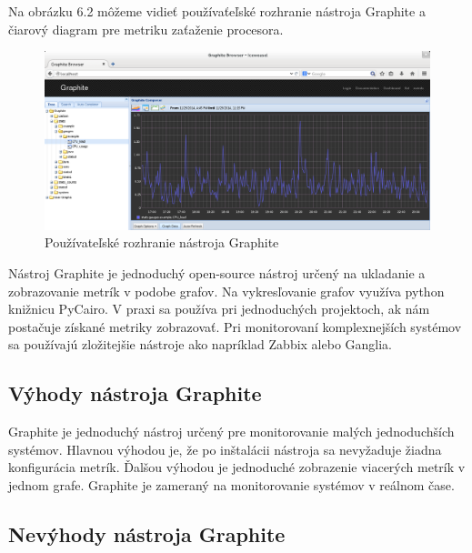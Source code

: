 \documentclass[a4paper, upjsfrontpage, disablespecwarning, thesismargins, thesislinespacing]{rnthesis}
\begin{document}
Na obrázku 6.2 môžeme vidieť používaťeľské rozhranie nástroja Graphite a čiarový diagram pre metriku zaťaženie procesora.

\begin{figure}
\begin{center}
\includegraphics[scale=0.41]{graphite1.png}
\caption{Používateľské rozhranie nástroja Graphite}
\end{center}
\end{figure}

Nástroj Graphite je jednoduchý open-source nástroj určený na ukladanie a zobrazovanie metrík v podobe grafov.
Na vykresľovanie grafov využíva python knižnicu PyCairo.
V praxi sa používa pri jednoduchých projektoch, ak nám postačuje získané metriky zobrazovať.
Pri monitorovaní komplexnejších systémov sa používajú zložitejšie nástroje ako napríklad Zabbix alebo Ganglia.

\subsection{Výhody nástroja Graphite}

Graphite je jednoduchý nástroj určený pre monitorovanie malých jednoduchších systémov.
Hlavnou výhodou je, že po inštalácii nástroja sa nevyžaduje žiadna konfigurácia metrík.
Ďalšou výhodou je jednoduché zobrazenie viacerých metrík v jednom grafe.
Graphite je zameraný na monitorovanie systémov v reálnom čase.

\subsection{Nevýhody nástroja Graphite}
\end{document}
